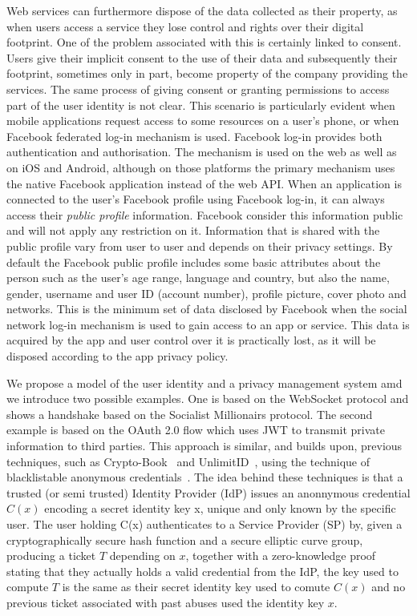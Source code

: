 Web services can furthermore dispose of the data collected as their property, as when users access a service they lose control and rights over their digital footprint. One of the problem associated with this is certainly linked to consent. Users give their implicit consent to the use of their data and subsequently their footprint, sometimes only in part, become property of the company providing the services. The same process of giving consent or granting permissions to access part of the user identity is not clear. This scenario is particularly evident when mobile applications request access to some resources on a user's phone, or when Facebook federated log-in mechanism is used. Facebook log-in provides both authentication and authorisation. The mechanism is used on the web as well as on iOS and Android, although on those platforms the primary mechanism uses the native Facebook application instead of the web API. When an application is connected to the user's Facebook profile using Facebook log-in, it can always access their \emph{public profile} information. Facebook consider this information public and will not apply any restriction on it. Information that is shared with the public profile vary from user to user and depends on their privacy settings. By default the Facebook public profile includes some basic attributes about the person such as the user's age range, language and country, but also the name, gender, username and user ID (account number), profile picture, cover photo and networks. This is the minimum set of data disclosed by Facebook when the social network log-in mechanism is used to gain access to an app or service. This data is acquired by the app and user control over it is practically lost, as it will be disposed according to the app privacy policy.

We propose a model of the user identity and a privacy management system amd we introduce two possible examples. One is based on the WebSocket protocol and shows a handshake based on the Socialist Millionairs protocol. The second example is based on the OAuth 2.0 flow which uses JWT to transmit private information to third parties. This approach is similar, and builds upon, previous techniques, such as Crypto-Book~\cite{maheswaran2013crypto} and UnlimitID~\cite{isaakidis2016unlimitid}, using the technique of blacklistable anonymous credentials~\cite{tsang2007blacklistable}. The idea behind these techniques is that a trusted (or semi trusted) Identity Provider (IdP) issues an anonnymous credential $C(x)$ encoding a secret identity key x, unique and only known by the specific user. The user holding C(x) authenticates to a Service Provider (SP) by, given a cryptographically secure hash function and a secure elliptic curve group, producing a ticket $T$ depending on $x$, together with a zero-knowledge proof stating that they actually holds a valid credential from the IdP, the key used to compute $T$ is the same as their secret identity key used to comute $C(x)$ and no previous ticket associated with past abuses used the identity key $x$.

